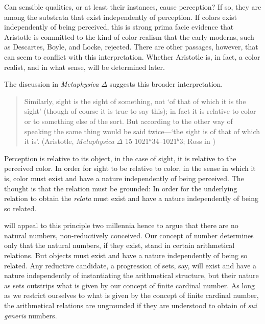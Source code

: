 Can sensible qualities, or at least their instances, cause perception? If so, they are among the substrata that exist independently of perception. If colors exist independently of being perceived, this is strong prima facie evidence that Aristotle is committed to the kind of color realism that the early moderns, such as Descartes, Boyle, and Locke, rejected. There are other passages, however, that can seem to conflict with this interpretation. Whether Aristotle is, in fact, a color realist, and in what sense, will be determined later.

The discussion in \emph{Metaphysica} \( \Delta \) suggests this broader interpretation.
\begin{quote}
	Similarly, sight is the sight of something, not `of that of which it is the sight' (though of course it is true to say this); in fact it is relative to color or to something else of the sort. But according to the other way of speaking the same thing would be said twice---`the sight is of that of which it is'. (Aristotle, \emph{Metaphysica} \( \Delta \) 15 1021\( ^{a} \)34--1021\( ^{b} \)3; Ross in \citealt[76]{Barnes:1984kx})
\end{quote}
Perception is relative to its object, in the case of sight, it is relative to the perceived color. In order for sight to be relative to color, in the sense in which it is, color must exist and have a nature independently of being perceived. The thought is that the relation must be grounded: In order for the underlying relation to obtain the \emph{relata} must exist and have a nature independently of being so related.

\citet{Benacerraf:1965sh} will appeal to this principle two millennia hence to argue that there are no natural numbers, non-reductively conceived. Our concept of number determines only that the natural numbers, if they exist, stand in certain arithmetical relations. But objects must exist and have a nature independently of being so related. Any reductive candidate, a progression of sets, say, will exist and have a nature independently of instantiating the arithmetical structure, but their nature as sets outstrips what is given by our concept of finite cardinal number. As long as we restrict ourselves to what is given by the concept of finite cardinal number, the arithmetical relations are ungrounded if they are understood to obtain of \emph{sui generis} numbers.

